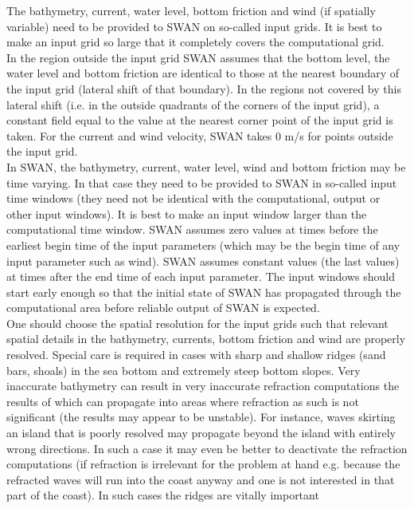 \documentclass[12pt]{book}
\begin{document}
The bathymetry, current, water level, bottom friction and wind (if spatially variable) need to be provided to
SWAN on so-called input grids. It is best to make an input grid so large that it completely covers the
computational grid.
\\[2ex]
\noindent
In the region outside the input grid SWAN assumes that the bottom level, the water level and bottom
friction are identical to those at the nearest boundary of the input grid (lateral shift of that boundary).
In the regions not covered by this lateral shift (i.e. in the outside quadrants of the corners of the input
grid), a constant field equal to the value at the nearest corner point of the input grid is taken. For the
current and wind velocity, SWAN takes 0 m/s for points outside the input grid.
\\[2ex]
\noindent
In SWAN, the bathymetry, current, water level, wind and bottom friction may be time varying. In that case
they need to be provided to SWAN in so-called input time windows (they need not be identical with the
computational, output or other input windows). It is best to make an input window larger than the
computational time window. SWAN assumes zero values at times before the earliest begin time of the
input parameters (which may be the begin time of any input parameter such as wind). SWAN assumes
constant values (the last values) at times after the end time of each input parameter. The input windows
should start early enough so that the initial state of SWAN has propagated through the computational area
before reliable output of SWAN is expected.
\\[2ex]
\noindent
One should choose the spatial resolution for the input grids such that relevant spatial details in the
bathymetry, currents, bottom friction and wind are properly resolved. Special care is required in cases with
sharp and shallow ridges (sand bars, shoals) in the sea bottom and extremely steep bottom slopes. Very
inaccurate bathymetry can result in very inaccurate refraction computations the results of which can
propagate into areas where refraction as such is not significant (the results may appear to be unstable).
For instance, waves skirting an island that is poorly resolved may propagate beyond the island with
entirely wrong directions. In such a case it may even be better to deactivate the refraction computations
(if refraction is irrelevant for the problem at hand e.g. because the refracted waves will run into the coast
anyway and one is not interested in that part of the coast). In such cases the ridges are vitally important
\end{document}
